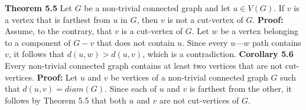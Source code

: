 \nopagenumbers
{\bf Theorem 5.5}
\vskip 6pt
Let $G$ be a non-trivial connected graph and let $u \in V(G)$. If $v$ is a vertex that is farthest from $u$ in $G$, then $v$ is not a cut-vertex of $G$.
\vskip 10pt
{\bf Proof:}
\vskip 6pt
Assume, to the contrary, that $v$ is a cut-vertex of $G$. Let $w$ be a vertex belonging to a component of $G-v$ that does not contain $u$. Since every $u$---$w$ path contains $v$, it follows that $d(u,w) > d(u,v)$, which is a contradiction.
\vskip 10pt
{\bf Corollary 5.6}
\vskip 6pt
Every non-trivial connected graph contains at least two vertices that are not cut-vertices.
\vskip 10pt
{\bf Proof:}
\vskip 6pt
Let $u$ and $v$ be vertices of a non-trivial connected graph $G$ such that $d(u,v)=diam(G)$. Since each of $u$ and $v$ is farthest from the other, it follows by Theorem 5.5 that both $u$ and $v$ are not cut-vertices of $G$.



\vfill\eject
